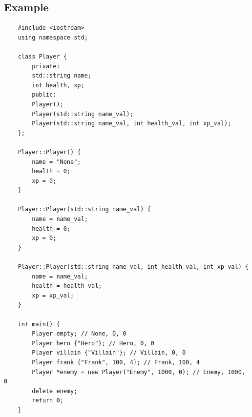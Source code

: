 \subsection{Example}
\begin{verbatim}
    #include <iostream>
    using namespace std;

    class Player {
        private:
        std::string name;
        int health, xp;
        public:
        Player();
        Player(std::string name_val);
        Player(std::string name_val, int health_val, int xp_val);
    };

    Player::Player() {
        name = "None";
        health = 0;
        xp = 0;
    }

    Player::Player(std::string name_val) {
        name = name_val;
        health = 0;
        xp = 0;
    }

    Player::Player(std::string name_val, int health_val, int xp_val) {
        name = name_val;
        health = health_val;
        xp = xp_val;
    }

    int main() {
        Player empty; // None, 0, 0
        Player hero {"Hero"}; // Hero, 0, 0
        Player villain {"Villain"}; // Villain, 0, 0
        Player frank {"Frank", 100, 4}; // Frank, 100, 4
        Player *enemy = new Player("Enemy", 1000, 0); // Enemy, 1000, 0
        delete enemy;
        return 0;
    }
\end{verbatim}


